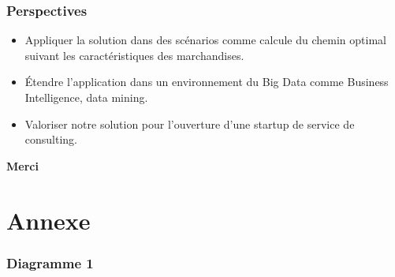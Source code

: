 \documentclass{beamer}
\begin{document}
\begin{frame}
    \frametitle{Perspectives}
    \begin{itemize}
        \item Appliquer la solution dans des scénarios comme calcule du chemin optimal suivant les caractéristiques des marchandises.
        \item Étendre l'application dans un environnement du Big Data comme Business Intelligence, data mining.
        \item Valoriser notre solution pour l'ouverture d'une startup de service de consulting.
    \end{itemize}
\end{frame}

\begin{frame}
    \begin{center}
        \bfseries \Huge
        Merci
    \end{center}
\end{frame}

\section*{Annexe}
\begin{frame}
\frametitle{Diagramme 1}
\end{frame}
\end{document}
